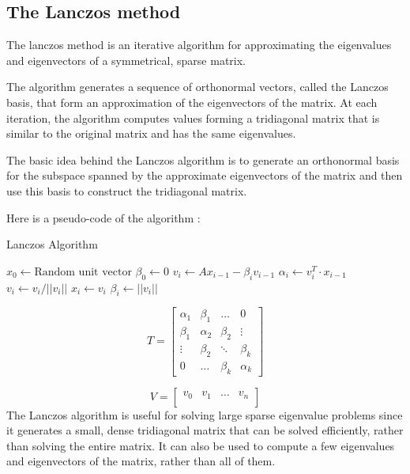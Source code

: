 \documentclass{book}
\begin{document}
\subsection{The Lanczos method}

The lanczos method is an iterative algorithm for approximating the eigenvalues and eigenvectors of a symmetrical, sparse matrix.

The algorithm generates a sequence of orthonormal vectors, called the Lanczos basis, that form an approximation of the eigenvectors of the matrix. At each iteration, the algorithm computes values forming a tridiagonal matrix that is similar to the original matrix and has the same eigenvalues.

The basic idea behind the Lanczos algorithm is to generate an orthonormal basis for the subspace spanned by the approximate eigenvectors of the matrix and then use this basis to construct the tridiagonal matrix.

Here is a pseudo-code of the algorithm :

\begin{algorithm}
  \caption{Lanczos Algorithm}
  \begin{algorithmic}[1]
    \State $\text{$x_{0}$} \gets \text{Random unit vector}$
    \State $\beta_{0} \gets 0$
   
    \State $\textit{v}_{i} \gets Ax_{i-1} - \beta_{i}\textit{v}_{i-1}$
    \State $\alpha_{i} \gets v_{i}^{T} \cdot x_{i-1}$
    \State $v_{i} \gets v_{i}/||v_{i}||$
    \State $x_{i} \gets v_{i}$
    \State $\beta_{i} \gets ||v_{i}||$
  \EndFor
  \end{algorithmic}
\end{algorithm}

$$
T=
\begin{bmatrix}
  \alpha_{1} & \beta_{1} & \ldots & 0\\
  \beta_{1} & \alpha_{2} & \beta_{2} & \vdots \\
  \vdots & \beta_{2} &  \ddots & \beta_{k} \\
  0 & \ldots & \beta_{k} & \alpha_{k}
\end{bmatrix}
$$

$$
V=
\begin{bmatrix}
  v_{0} & v_{1} & \ldots & v_{n} \\
\end{bmatrix}
$$
The Lanczos algorithm is useful for solving large sparse eigenvalue problems since it generates a small, dense tridiagonal matrix that can be solved efficiently, rather than solving the entire matrix. It can also be used to compute a few eigenvalues and eigenvectors of the matrix, rather than all of them.
\end{document}
